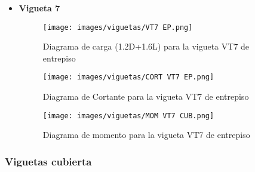 \begin{itemize}
            \item \textbf{Vigueta 7}\\
            \begin{figure}[H]
                \centering
                \texttt{[image: images/viguetas/VT7 EP.png]} 
                \caption{Diagrama de carga (1.2D+1.6L) para la vigueta VT7 de entrepiso}
                \label{fig:W VT7 EP}
            \end{figure}
            
            \begin{figure}[H]
                \centering
                \texttt{[image: images/viguetas/CORT VT7 EP.png]}
                \caption{Diagrama de Cortante para la vigueta VT7 de entrepiso}
                \label{fig:v VT7 EP}
            \end{figure}
            
             \begin{figure}[H]
                \centering
                \texttt{[image: images/viguetas/MOM VT7 CUB.png]} 
                \caption{Diagrama de momento para la vigueta VT7 de entrepiso}
                \label{fig:M VT7 EP}
            \end{figure}
\end{itemize}

\subsubsection{Viguetas cubierta}

